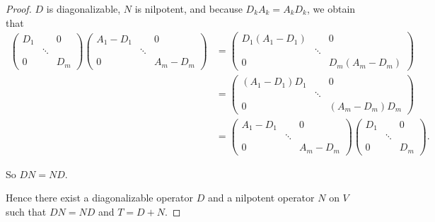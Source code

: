 \begin{proof}
    $D$ is diagonalizable, $N$ is nilpotent, and because $D_{k}A_{k} = A_{k}D_{k}$, we obtain that
    \begin{align*}
        \begin{pmatrix}
            D_{1} &        & 0     \\
                  & \ddots &       \\
            0     &        & D_{m}
        \end{pmatrix}
        \begin{pmatrix}
            A_{1} - D_{1} &        & 0             \\
                          & \ddots &               \\
            0             &        & A_{m} - D_{m}
        \end{pmatrix}
         & =
        \begin{pmatrix}
            D_{1}(A_{1} - D_{1}) &        & 0                    \\
                                 & \ddots &                      \\
            0                    &        & D_{m}(A_{m} - D_{m})
        \end{pmatrix} \\
         & =
        \begin{pmatrix}
            (A_{1} - D_{1})D_{1} &        & 0                    \\
                                 & \ddots &                      \\
            0                    &        & (A_{m} - D_{m})D_{m}
        \end{pmatrix} \\
         & =
        \begin{pmatrix}
            A_{1} - D_{1} &        & 0             \\
                          & \ddots &               \\
            0             &        & A_{m} - D_{m}
        \end{pmatrix}
        \begin{pmatrix}
            D_{1} &        & 0     \\
                  & \ddots &       \\
            0     &        & D_{m}
        \end{pmatrix}.
    \end{align*}

    So $DN = ND$.

    Hence there exist a diagonalizable operator $D$ and a nilpotent operator $N$ on $V$ such that $DN = ND$ and $T = D + N$.
\end{proof}
\newpage

